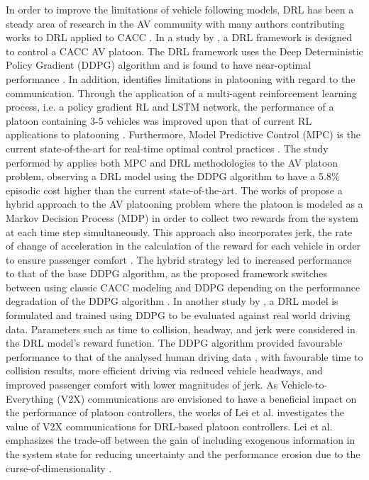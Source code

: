 In order to improve the limitations of vehicle following models, DRL has been a
steady area of research in the AV community with many authors contributing works
to DRL applied to CACC \cite{Lin2019, Song2020, Chu2019b, Peake2020}.  In a study
by \cite{Lin2019},  a DRL framework is designed to control a CACC AV platoon.  The
DRL framework uses the Deep Deterministic Policy Gradient (DDPG) \cite{Lillicrap2016}
algorithm and is found to have near-optimal performance \cite{Lin2019}.  In addition,
\cite{Peake2020} identifies limitations in platooning with regard to the communication.
Through the application of a multi-agent reinforcement learning process, i.e. a policy
gradient RL and LSTM network, the performance of a platoon containing 3-5 vehicles was
improved upon that of current RL applications to platooning \cite{Peake2020}. Furthermore,
Model Predictive Control (MPC) is the current state-of-the-art for real-time optimal
control practices \cite{Lin_2021}.  The study performed by \cite{Lin_2021} applies both
MPC and DRL methodologies to the AV platoon problem, observing a DRL model using the
DDPG algorithm to have a 5.8\% episodic cost higher than the current state-of-the-art.
The works of \cite{yan2021hybrid} propose a hybrid approach to the AV platooning
problem where the platoon is modeled as a Markov Decision Process (MDP) in order to
collect two rewards from the system at each time step simultaneously.  This approach
also incorporates jerk, the rate of change of acceleration in the calculation of the
reward for each vehicle in order to ensure passenger comfort \cite{yan2021hybrid}.  The
hybrid strategy led to increased performance to that of the base DDPG algorithm, as the
proposed framework switches between using classic CACC modeling and DDPG depending on
the performance degradation of the DDPG algorithm \cite{yan2021hybrid}. In another
study by \cite{Zhu2019}, a DRL model is formulated and trained using DDPG to be evaluated
against real world driving data. Parameters such as time to collision, headway, and jerk
were considered in the DRL model's reward function.  The DDPG algorithm provided favourable
performance to that of the analysed human driving data \cite{Zhu2019}, with favourable
time to collision results, more efficient driving via reduced vehicle headways, and
improved passenger comfort with lower magnitudes of jerk. As Vehicle-to-Everything (V2X)
communications are envisioned to have a beneficial impact on the performance of platoon
controllers, the works of Lei et al. investigates the value of V2X communications for
DRL-based platoon controllers. Lei et al. emphasizes the trade-off between the gain of
including exogenous information in the system state for reducing uncertainty and the
performance erosion due to the curse-of-dimensionality \cite{LeiV2x}.

